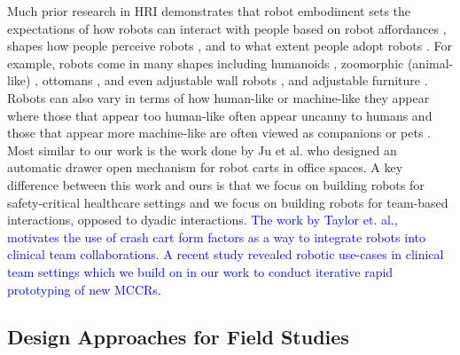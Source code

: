 Much prior research in HRI demonstrates that robot embodiment sets the expectations of how robots can interact with people based on robot affordances \cite{norman1999affordance,gibson20133}, shapes how people perceive robots \cite{passman1975mothers,rani2004anxiety, bauer2008human}, and to what extent people adopt robots \cite{riek2017healthcare}.
For example, robots come in many shapes including humanoids \cite{bauer2008human,hayashi2007humanoid,kose2009effects,krogsager2014backchannel}, zoomorphic (animal-like) \cite{short2017understanding,kalegina2018characterizing}, ottomans \cite{sirkin2015mechanical}, and even adjustable wall robots \cite{nguyen2021exploring,wang2019design}, and adjustable furniture \cite{hauser2020roombots,nigolian2017self}.
Robots can also vary in terms of how human-like or machine-like they appear where those that appear too human-like often appear uncanny to humans \cite{strait2015too,koschate2016overcoming} and those that appear more machine-like are often viewed as companions or pets \cite{loffler2020uncanny}. 
Most similar to our work is the work done by Ju et al. \cite{mok2015place} who designed an automatic drawer open mechanism for robot carts in office spaces.
A key difference between this work and ours is that we focus on building robots for safety-critical healthcare settings and we focus on building robots for team-based interactions, opposed to dyadic interactions.
\textcolor{blue}{The work by Taylor et. al., \cite{taylor2019coordinating,taylor2024towards} motivates the use of crash cart form factors as a way to integrate robots into clinical team collaborations. A recent study revealed robotic use-cases in clinical team settings which we build on in our work to conduct iterative rapid prototyping of new MCCRs.}

\subsection{Design Approaches for Field Studies}

